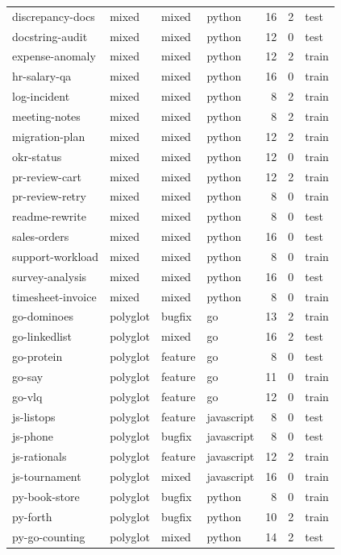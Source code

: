 \begin{xltabular}{\textwidth}{@{}l l l l r r l@{}}
discrepancy-docs & mixed & mixed & python & 16 & 2 & test \\
docstring-audit & mixed & mixed & python & 12 & 0 & test \\
expense-anomaly & mixed & mixed & python & 12 & 2 & train \\
hr-salary-qa & mixed & mixed & python & 16 & 0 & train \\
log-incident & mixed & mixed & python & 8 & 2 & train \\
meeting-notes & mixed & mixed & python & 8 & 2 & train \\
migration-plan & mixed & mixed & python & 12 & 2 & train \\
okr-status & mixed & mixed & python & 12 & 0 & train \\
pr-review-cart & mixed & mixed & python & 12 & 2 & train \\
pr-review-retry & mixed & mixed & python & 8 & 0 & train \\
readme-rewrite & mixed & mixed & python & 8 & 0 & test \\
sales-orders & mixed & mixed & python & 16 & 0 & test \\
support-workload & mixed & mixed & python & 8 & 0 & train \\
survey-analysis & mixed & mixed & python & 16 & 0 & test \\
timesheet-invoice & mixed & mixed & python & 8 & 0 & train \\
go-dominoes & polyglot & bugfix & go & 13 & 2 & train \\
go-linkedlist & polyglot & mixed & go & 16 & 2 & test \\
go-protein & polyglot & feature & go & 8 & 0 & test \\
go-say & polyglot & feature & go & 11 & 0 & train \\
go-vlq & polyglot & feature & go & 12 & 0 & train \\
js-listops & polyglot & feature & javascript & 8 & 0 & test \\
js-phone & polyglot & bugfix & javascript & 8 & 0 & test \\
js-rationals & polyglot & feature & javascript & 12 & 2 & train \\
js-tournament & polyglot & mixed & javascript & 16 & 0 & train \\
py-book-store & polyglot & bugfix & python & 8 & 0 & train \\
py-forth & polyglot & bugfix & python & 10 & 2 & train \\
py-go-counting & polyglot & mixed & python & 14 & 2 & test \\

\end{xltabular}
